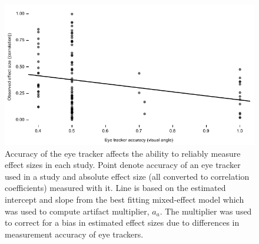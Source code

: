 \documentclass[english,natbib,man,floatsintext]{apa6}
\begin{document}
\begin{figure}
\includegraphics{ET_accuracy_effectsize}
\centering
\caption{Accuracy of the eye tracker affects the ability to reliably measure effect sizes in each study. Point denote accuracy of an eye tracker used in a study and absolute effect size (all converted to correlation coefficients) measured with it. Line is based on the estimated intercept and slope from the best fitting mixed-effect model which was used to compute artifact multiplier, $a_a$. The multiplier was used to correct for a bias in estimated effect sizes due to differences in measurement accuracy of eye trackers.}
\label{fig:ET_accuracy_effectsize}
\end{figure}
\clearpage



\clearpage
\end{document}
